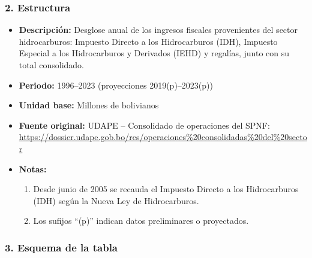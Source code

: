\documentclass[12pt,a4paper]{article}
\begin{document}
\subsubsection*{2. Estructura}
\begin{itemize}
  \item \textbf{Descripción:} Desglose anual de los ingresos fiscales provenientes del sector hidrocarburos: Impuesto Directo a los Hidrocarburos (IDH), Impuesto Especial a los Hidrocarburos y Derivados (IEHD) y regalías, junto con su total consolidado.
  \item \textbf{Periodo:} 1996–2023 (proyecciones 2019(p)–2023(p))
  \item \textbf{Unidad base:} Millones de bolivianos
  \item \textbf{Fuente original:} UDAPE – Consolidado de operaciones del SPNF:\\
    \url{https://dossier.udape.gob.bo/res/operaciones%20consolidadas%20del%20sector}
  \item \textbf{Notas:}
    \begin{enumerate}
      \item Desde junio de 2005 se recauda el Impuesto Directo a los Hidrocarburos (IDH) según la Nueva Ley de Hidrocarburos.
      \item Los sufijos “(p)” indican datos preliminares o proyectados.
    \end{enumerate}
\end{itemize}

\subsubsection*{3. Esquema de la tabla}
\end{document}

